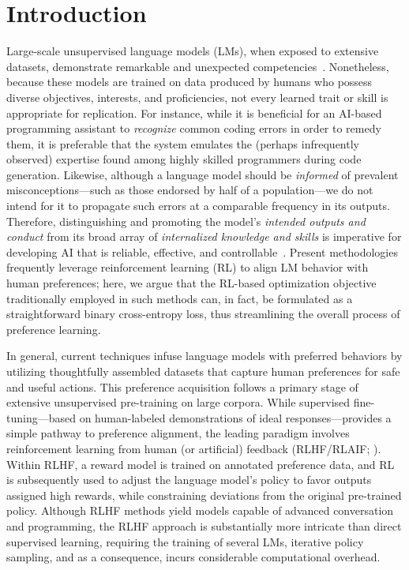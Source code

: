 \section{Introduction}
Large-scale unsupervised language models (LMs), when exposed to extensive datasets, demonstrate remarkable and unexpected competencies~\citep{chowdhery2022palm, brown2020language, touvron2023llama, bubeck2023sparks}. Nonetheless, because these models are trained on data produced by humans who possess diverse objectives, interests, and proficiencies, not every learned trait or skill is appropriate for replication. For instance, while it is beneficial for an AI-based programming assistant to \textit{recognize} common coding errors in order to remedy them, it is preferable that the system emulates the (perhaps infrequently observed) expertise found among highly skilled programmers during code generation. Likewise, although a language model should be \textit{informed} of prevalent misconceptions—such as those endorsed by half of a population—we do not intend for it to propagate such errors at a comparable frequency in its outputs. Therefore, distinguishing and promoting the model's \emph{intended outputs and conduct} from its broad array of \textit{internalized knowledge and skills} is imperative for developing AI that is reliable, effective, and controllable~\citep{ouyang2022training}. Present methodologies frequently leverage reinforcement learning (RL) to align LM behavior with human preferences; here, we argue that the RL-based optimization objective traditionally employed in such methods can, in fact, be formulated as a straightforward binary cross-entropy loss, thus streamlining the overall process of preference learning.

In general, current techniques infuse language models with preferred behaviors by utilizing thoughtfully assembled datasets that capture human preferences for safe and useful actions. This preference acquisition follows a primary stage of extensive unsupervised pre-training on large corpora. While supervised fine-tuning—based on human-labeled demonstrations of ideal responses—provides a simple pathway to preference alignment, the leading paradigm involves reinforcement learning from human (or artificial) feedback (RLHF/RLAIF; \citep{christiano2017deep,bai2022constitutional}). Within RLHF, a reward model is trained on annotated preference data, and RL is subsequently used to adjust the language model’s policy to favor outputs assigned high rewards, while constraining deviations from the original pre-trained policy. Although RLHF methods yield models capable of advanced conversation and programming, the RLHF approach is substantially more intricate than direct supervised learning, requiring the training of several LMs, iterative policy sampling, and as a consequence, incurs considerable computational overhead.

